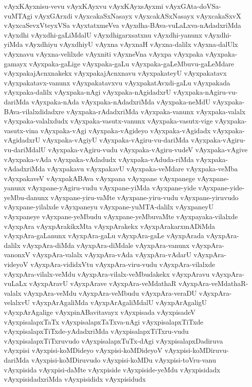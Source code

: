 {vAyxKAyxnisu-vevu
vAyxKAyxvu
vAyxKAyxsAyxmi
vAyxGAta-doVSa-vuMTAgi
vAyxGArxdi
vAyxcakaSxNasayx
vAyxcakASxNasayx
vAyxcakaSxvX
vAyxcaSevxVteyxVSa
vAyxtatxmeVva
vAyxdha-BAva-vuLaLxva-nAdadxriMda
vAyxdhi
vAyxdhi-gaLiMdalU
vAyxdhigarxsatxnu
vAyxdhi-yanunx
vAyxdhi-yiMda
vAyxdhiyu
vAyxdhiyU
vAyxna
vAyxnaH
vAyxna-dalilx
vAyxna-dalUlx
vAyxnavu
vAyxna-velilxde
vAyxniti
vAyxneVna
vAyxpa
vAyxpaka
vAyxpaka-gamayx
vAyxpaka-gaLige
vAyxpaka-gaLu
vAyxpaka-gaLeMbuvu-gaLeMdare
vAyxpakajAcnxnakekx
vAyxpakajAcnxnavu
vAyxpakateyU
vAyxpakatavx
vAyxpakatavx-vanunx
vAyxpakatavxvu
vAyxpakatAvxdi-gaLu
vAyxpakada
vAyxpaka-dalilx
vAyxpaka-nAgi
vAyxpaka-nAgidadxrU
vAyxpaka-nAgiru-vu-dariMda
vAyxpaka-nAda
vAyxpaka-nAdadxriMda
vAyxpaka-neMdU
vAyxpaka-BAva-vilalxdidadxre
vAyxpaka-rAdadxriMda
vAyxpaka-vanunx
vAyxpaka-valalx
vAyxpaka-valalxdudx
vAyxpaka-vasutx-vanunx
vAyxpaka-vasutx-vige
vAyxpaka-vasutx-vina
vAyxpaka-vAgi
vAyxpaka-vAgideyo
vAyxpaka-vAgidadx
vAyxpaka-vAgidadxrU
vAyxpaka-vAgiyU
vAyxpaka-vAgiru-vu-dariMda
vAyxpaka-vAgiru-vu-dariMdalU
vAyxpaka-vAgiru-vudu
vAyxpaka-vAgiru-vudeV
vAyxpaka-vAgive
vAyxpaka-vAda
vAyxpaka-vAdadudx
vAyxpaka-vAduda-riMda
vAyxpaka-vAdadxriMda
vAyxpakavu
vAyxpakavU
vAyxpaka-veMdare
vAyxpaka-veMba
vAyxpakaveV
vAyxpakABAva
vAyxpana
vAyxpane
vAyxpanege
vAyxpane-yanunx
vAyxpane-yAgiru-vudu
vAyxpane-yiMda
vAyxpane-yide
vAyxpane-yide-yeMbu-danunx
vAyxpane-yiru-vaMte
vAyxpane-yiru-vudu
vAyxpane-yiruvudo
vAyxpane-yilalxde
vAyxpaneyu
vAyxpane-yuMTA-dalilx
vAyxpaneyU
vAyxpaneye
vAyxpane-yeMbudu
vAyxpane-yeMbuvaMte
vAyxpayaka-vilalxde
vAyxpAra
vAyxpArakikxMta
vAyxpArakekx
vAyxpArakarxmADiMda
vAyxpAra-gaLanunx
vAyxpAra-gaLu
vAyxpAra-gaLe
vAyxpArada
vAyxpAra-dalilx
vAyxpAra-diMda
vAyxpAra-diMdale
vAyxpAra-vanunx
vAyxpAra-vanonxV
vAyxpAra-valalx
vAyxpAra-vAda
vAyxpAra-vAdarU
vAyxpAra-videyoV
vAyxpAra-vididxVtu
vAyxpAra-viru-vudu
vAyxpAra-vilalxde
vAyxpAra-vilalx-veMdu
vAyxpAra-vilalx-veMbudakekx
vAyxpAravu
vAyxpAra-vuLaLx
vAyxpAravU
vAyxpArave
vAyxpAra-veMdathaR
vAyxpAra-veMdathaR-valalx
vAyxpAra-veMdu
vAyxpAra-veMbudu
vAyxpAra-veraDU
vAyxpAra-velalxvU
vAyxpArAgaliMda
vAyxpArAgaliMdalU
vAyxpArAgaligU
vAyxpArAgalige
vAyxpinABavitavayx
vAyxpisada
vAyxpisadeV
vAyxpisalapxTaTx
vAyxpisalapxTaTxva-nAgi
vAyxpisalapxTiTxde
vAyxpisalapxTiTxde-yAdadxriMda
vAyxpisalapxTiTxru-vudu
vAyxpisalapxTiTxruvudo
vAyxpisalapxTuTx-dAgi
vAyxpisalapxDadiruva
vAyxpisi
vAyxpisi-koMDideyo
vAyxpisi-koMDideyoV
vAyxpisi-koMDiruvu-dariMda
vAyxpisi-koMDiruvudo
vAyxpisi-koMDu
vAyxpisi-toVru-vanu
vAyxpisida
vAyxpisi-daMte
vAyxpiside
vAyxpiside-yeMdu
vAyxpisidadx
vAyxpisidadxriMda
vAyxpisididx
vAyxpisidudx
}
